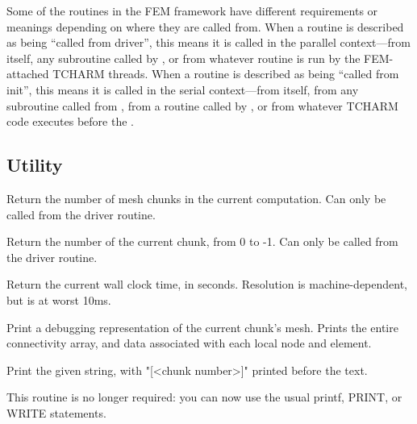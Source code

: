 \documentclass[10pt]{article}
\begin{document}
Some of the routines in the FEM framework have different requirements or meanings
depending on where they are called from.  When a routine is described
as being ``called from driver'', this means it is called in the parallel
context---from  itself, any subroutine called by ,
or from whatever routine is run by the FEM-attached TCHARM threads.
When a routine is described as being ``called from init'', this means it is 
called in the serial context---from  itself, from any subroutine
called from , from a routine called by ,
or from whatever TCHARM code executes before the .


\subsection{Utility}


     Return the number of mesh chunks in the current computation.  Can
     only be called from the driver routine.


     Return the number of the current chunk, from 0 to
     -1.  Can only be called from the driver routine.


     Return the current wall clock time, in seconds.  Resolution is
     machine-dependent, but is at worst 10ms.


     Print a debugging representation of the current chunk's mesh.
     Prints the entire connectivity array, and data associated with
     each local node and element.


     Print the given string, with "[<chunk number>]" printed 
     before the text.  

     This routine is no longer required: you can now use 
     the usual printf, PRINT, or WRITE statements.
\end{document}
